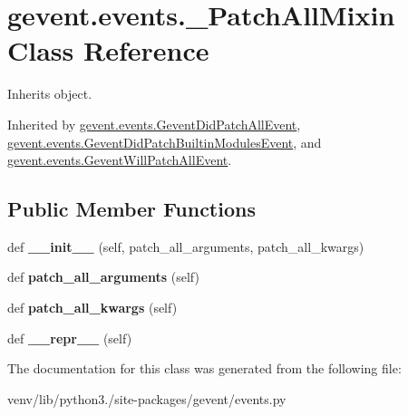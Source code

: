 \hypertarget{classgevent_1_1events_1_1___patch_all_mixin}{}\section{gevent.\+events.\+\_\+\+Patch\+All\+Mixin Class Reference}
\label{classgevent_1_1events_1_1___patch_all_mixin}


Inherits object.



Inherited by \hyperlink{classgevent_1_1events_1_1_gevent_did_patch_all_event}{gevent.\+events.\+Gevent\+Did\+Patch\+All\+Event}, \hyperlink{classgevent_1_1events_1_1_gevent_did_patch_builtin_modules_event}{gevent.\+events.\+Gevent\+Did\+Patch\+Builtin\+Modules\+Event}, and \hyperlink{classgevent_1_1events_1_1_gevent_will_patch_all_event}{gevent.\+events.\+Gevent\+Will\+Patch\+All\+Event}.

\subsection*{Public Member Functions}
\begin{DoxyCompactItemize}
\item 
\mbox{\label{classgevent_1_1events_1_1___patch_all_mixin_ab10c0c23db463d2b8d861c7c147275ae}} 
def {\bfseries \+\_\+\+\_\+init\+\_\+\+\_\+} (self, patch\+\_\+all\+\_\+arguments, patch\+\_\+all\+\_\+kwargs)
\item 
\mbox{\label{classgevent_1_1events_1_1___patch_all_mixin_aa81bbcd33f8b1e9c881b1a771c403af3}} 
def {\bfseries patch\+\_\+all\+\_\+arguments} (self)
\item 
\mbox{\label{classgevent_1_1events_1_1___patch_all_mixin_aadd35b10f4b5683df27e5a1b92a4fcaf}} 
def {\bfseries patch\+\_\+all\+\_\+kwargs} (self)
\item 
\mbox{\label{classgevent_1_1events_1_1___patch_all_mixin_a83e29c7785c73e0b2f8e5f08b392eb1a}} 
def {\bfseries \+\_\+\+\_\+repr\+\_\+\+\_\+} (self)
\end{DoxyCompactItemize}


The documentation for this class was generated from the following file\+:\begin{DoxyCompactItemize}
\item 
venv/lib/python3./site-\/packages/gevent/events.\+py\end{DoxyCompactItemize}
